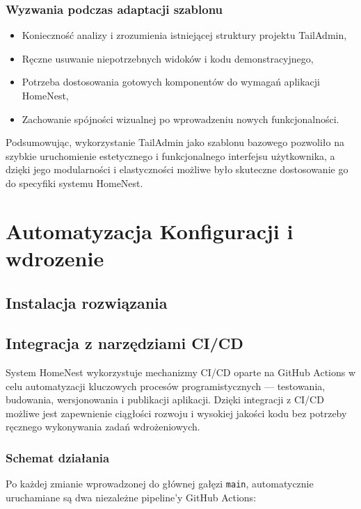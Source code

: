 \subsubsection{Wyzwania podczas adaptacji szablonu}
\begin{itemize}
    \item Konieczność analizy i zrozumienia istniejącej struktury projektu TailAdmin,
    \item Ręczne usuwanie niepotrzebnych widoków i kodu demonstracyjnego,
    \item Potrzeba dostosowania gotowych komponentów do wymagań aplikacji HomeNest,
    \item Zachowanie spójności wizualnej po wprowadzeniu nowych funkcjonalności.
\end{itemize}

Podsumowując, wykorzystanie TailAdmin jako szablonu bazowego pozwoliło na szybkie uruchomienie estetycznego i funkcjonalnego interfejsu użytkownika, a dzięki jego modularności i elastyczności możliwe było skuteczne dostosowanie go do specyfiki systemu HomeNest.


\section{Automatyzacja Konfiguracji i wdrozenie}

\subsection{Instalacja rozwiązania}


\subsection{Integracja z narzędziami CI/CD}
\label{sec:integracja_ci_cd}

System HomeNest wykorzystuje mechanizmy CI/CD oparte na GitHub Actions\cite{Actions} w celu automatyzacji kluczowych procesów programistycznych — testowania, budowania, wersjonowania i publikacji aplikacji. Dzięki integracji z CI/CD możliwe jest zapewnienie ciągłości rozwoju i wysokiej jakości kodu bez potrzeby ręcznego wykonywania zadań wdrożeniowych.

\subsubsection{Schemat działania}

Po każdej zmianie wprowadzonej do głównej gałęzi \texttt{main}, automatycznie uruchamiane są dwa niezależne pipeline'y GitHub Actions:

